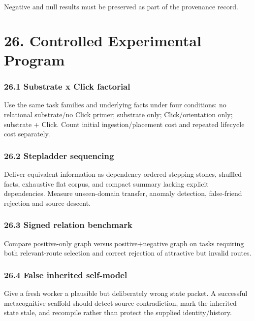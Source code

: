 \documentclass[
  10pt,
  letterpaper,
]{article}
\begin{document}
Negative and null results must be preserved as part of the provenance
record.

\section{26. Controlled Experimental
Program}\label{26-controlled-experimental-program}

\subsubsection{26.1 Substrate x Click
factorial}\label{261-substrate-x-click-factorial}

Use the same task families and underlying facts under four conditions:
no relational substrate/no Click primer; substrate only;
Click/orientation only; substrate + Click. Count initial
ingestion/placement cost and repeated lifecycle cost separately.

\subsubsection{26.2 Stepladder
sequencing}\label{262-stepladder-sequencing}

Deliver equivalent information as dependency-ordered stepping stones,
shuffled facts, exhaustive flat corpus, and compact summary lacking
explicit dependencies. Measure unseen-domain transfer, anomaly
detection, false-friend rejection and source descent.

\subsubsection{26.3 Signed relation
benchmark}\label{263-signed-relation-benchmark}

Compare positive-only graph versus positive+negative graph on tasks
requiring both relevant-route selection and correct rejection of
attractive but invalid routes.

\subsubsection{26.4 False inherited
self-model}\label{264-false-inherited-self-model}

Give a fresh worker a plausible but deliberately wrong state packet. A
successful metacognitive scaffold should detect source contradiction,
mark the inherited state stale, and recompile rather than protect the
supplied identity/history.
\end{document}
